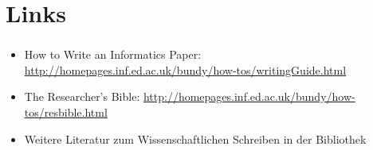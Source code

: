 \documentclass[aspectratio=169]{beamer}
\begin{document}
\section{Links}
\begin{frame}
  \frametitle{\insertsection}%
  \framesubtitle{\insertsubsection}%
  \begin{itemize}
   \item How to Write an Informatics Paper: \url{http://homepages.inf.ed.ac.uk/bundy/how-tos/writingGuide.html}
   \item The Researcher's Bible: \url{http://homepages.inf.ed.ac.uk/bundy/how-tos/resbible.html}
   \item Weitere Literatur zum Wissenschaftlichen Schreiben in der Bibliothek
  \end{itemize}
\end{frame}
\end{document}
